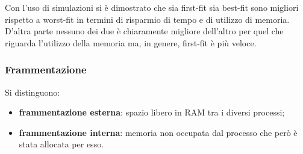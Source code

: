 \documentclass{article}
\begin{document}
				Con l’uso di simulazioni si è dimostrato che sia first-fit sia best-fit sono migliori rispetto a worst-fit in termini di risparmio di tempo e di utilizzo di memoria. D’altra parte nessuno dei due è chiaramente migliore dell’altro per quel che riguarda l’utilizzo della memoria ma, in genere, first-fit è più veloce.

			\subsubsection{Frammentazione}
				Si distinguono:
				\begin{itemize}
					\item \textbf{frammentazione esterna}: spazio libero in RAM tra i diversi processi;
					\item \textbf{frammentazione interna}: memoria non occupata dal processo che però è stata allocata per esso.
				\end{itemize}
				
\end{document}

